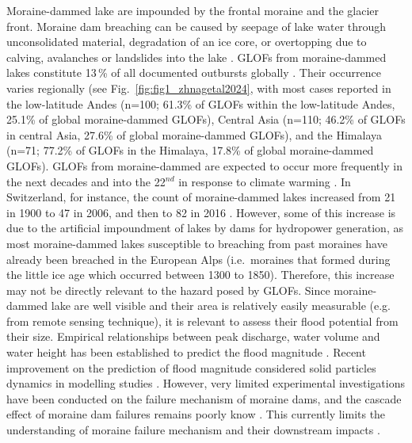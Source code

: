 Moraine-dammed lake are impounded by the frontal moraine and the glacier front. Moraine dam breaching can be caused by seepage of lake water through unconsolidated material, degradation of an ice core, or overtopping due to calving, avalanches or landslides into the lake \citep{Emmer2020,Tweed&Russel1999}. GLOFs from moraine-dammed lakes constitute 13\,\% of all documented outbursts globally \citep{Lutzow&al2023}. Their occurrence varies regionally (see Fig.~\ref{fig:fig1_zhnagetal2024}, with most cases reported in the low-latitude Andes (n=100; 61.3\% of GLOFs within the low-latitude Andes, 25.1\% of global moraine-dammed GLOFs), Central Asia (n=110; 46.2\% of GLOFs in central Asia, 27.6\% of global moraine-dammed GLOFs), and the Himalaya (n=71; 77.2\% of GLOFs in the Himalaya, 17.8\% of global moraine-dammed GLOFs). GLOFs from moraine-dammed are expected to occur more frequently in the next decades and into the 22$^{nd}$ in response to climate warming \citep{Harrison&al2018}. In Switzerland, for instance, the count of moraine-dammed lakes increased from 21 in 1900 to 47 in 2006, and then to 82 in 2016 \citep{Zhang&al2024}. However, some of this increase is due to the artificial impoundment of lakes by dams for hydropower generation, as most moraine-dammed lakes susceptible to breaching from past moraines have already been breached in the European Alps (i.e.\ moraines that formed during the little ice age which occurred between 1300 to 1850). Therefore, this increase may not be directly relevant to the hazard posed by GLOFs.%
Since moraine-dammed lake are well visible and their area is relatively easily measurable (e.g. from remote sensing technique), it is relevant to assess their flood potential from their size. Empirical relationships between peak discharge, water volume and water height has been established to predict the flood magnitude \citep[see][for a review on moraine-dammed lake failure]{Neupane&al2019}. Recent improvement on the prediction of flood magnitude considered solid particles dynamics in modelling studies \citep[e.g.][]{Mergili&al2018}. However, very limited experimental investigations have been conducted on the failure mechanism of moraine dams, and the cascade effect of moraine dam failures remains poorly know \citep{Somos-Valenzuelas&al2016}. This currently limits the understanding of moraine failure mechanism and their downstream impacts \citep{Neupane&al2019}. 

